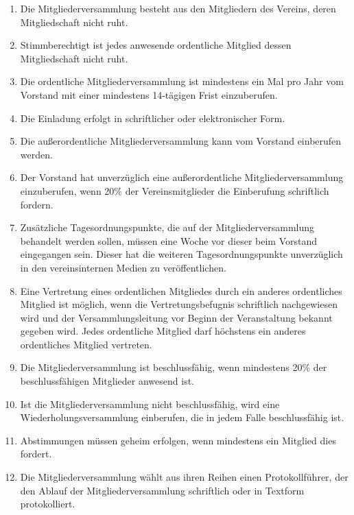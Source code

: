\documentclass[a4paper, 12pt]{scrartcl}
\begin{document}
\begin{enumerate}
  \item Die Mitgliederversammlung besteht aus den Mitgliedern des Vereins, deren Mitgliedschaft nicht ruht.
  \item Stimmberechtigt ist jedes anwesende ordentliche Mitglied dessen Mitgliedschaft nicht ruht.
  \item Die ordentliche Mitgliederversammlung ist mindestens ein Mal pro Jahr vom Vorstand mit einer mindestens 14-tägigen Frist einzuberufen.
  \item Die Einladung erfolgt in schriftlicher oder elektronischer Form.
  \item Die außerordentliche Mitgliederversammlung kann vom Vorstand einberufen werden.
  \item Der Vorstand hat unverzüglich eine außerordentliche Mitgliederversammlung einzuberufen, wenn 20\% der Vereinsmitglieder die Einberufung schriftlich fordern.
  \item Zusätzliche Tagesordnungspunkte, die auf der Mitgliederversammlung behandelt werden sollen, müssen eine Woche vor dieser beim Vorstand eingegangen sein. Dieser hat die weiteren Tagesordnungspunkte unverzüglich in den vereinsinternen Medien zu veröffentlichen.
  \item Eine Vertretung eines ordentlichen Mitgliedes durch ein anderes ordentliches Mitglied ist möglich, wenn die Vertretungsbefugnis schriftlich nachgewiesen wird und der Versammlungsleitung vor Beginn der Veranstaltung bekannt gegeben wird. Jedes ordentliche Mitglied darf höchstens ein anderes ordentliches Mitglied vertreten.
  \item Die Mitgliederversammlung ist beschlussfähig, wenn mindestens 20\% der beschlussfähigen Mitglieder anwesend ist.
  \item Ist die Mitgliederversammlung nicht beschlussfähig, wird eine Wiederholungsversammlung einberufen, die in jedem Falle beschlussfähig ist.
  \item Abstimmungen müssen geheim erfolgen, wenn mindestens ein Mitglied dies fordert.
  \item Die Mitgliederversammlung wählt aus ihren Reihen einen Protokollführer, der den Ablauf der Mitgliederversammlung schriftlich oder in Textform protokolliert.
\end{enumerate}
\end{document}
